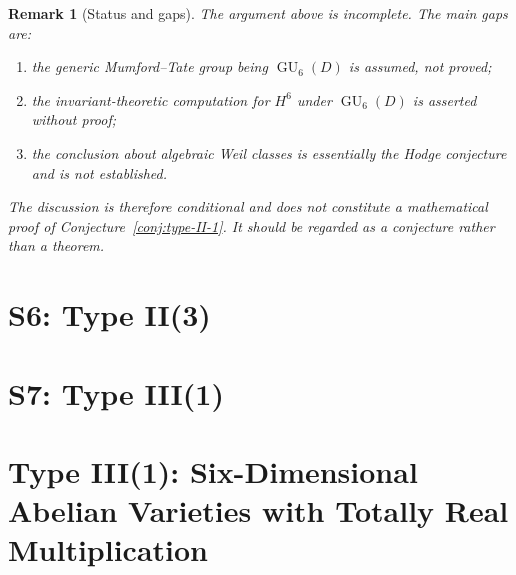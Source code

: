 \documentclass{article}
\DeclareMathOperator{\GU}{GU}
\newtheorem{remark}{Remark}
\begin{document}
\begin{remark}[Status and gaps]
The argument above is incomplete. The main gaps are:
\begin{enumerate}
  \item[(1)] the generic Mumford--Tate group being $\GU_6(D)$ is assumed, not proved;
  \item[(2)] the invariant-theoretic computation for $H^6$ under $\GU_6(D)$ is asserted without proof;
  \item[(3)] the conclusion about algebraic Weil classes is essentially the Hodge conjecture and is not established.
\end{enumerate}
The discussion is therefore conditional and does not constitute a mathematical proof of Conjecture~\ref{conj:type-II-1}. It should be regarded as a conjecture rather than a theorem.
\end{remark}

\section{S6: Type II(3)}

\section{S7: Type III(1)}
\section{Type III(1): Six-Dimensional Abelian Varieties with Totally Real Multiplication}
\end{document}
